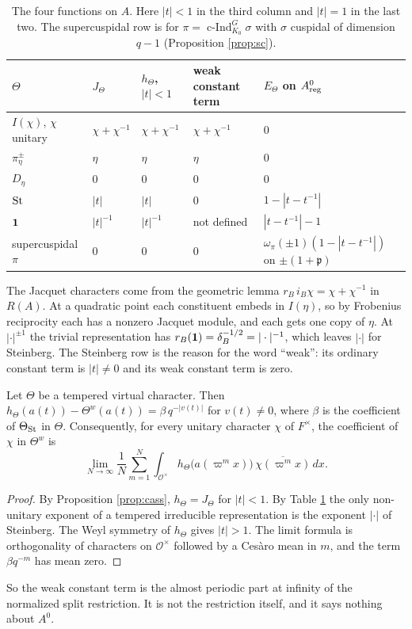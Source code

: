 \begin{table}[htbp]\centering\small
\caption{The four functions on $A$. Here $|t|<1$ in the third column and $|t|=1$ in the last two. The supercuspidal row is for $\pi=\operatorname{c-Ind}_{K_0}^G\sigma$ with $\sigma$ cuspidal of dimension $q-1$ (Proposition \ref{prop:sc}).}\label{tab:four}
\begin{tabular}{@{}lllll@{}}\toprule
$\Theta$ & $J_\Theta$ & $h_\Theta$, $|t|<1$ & weak constant term & $E_\Theta$ on $A^0_{\rm reg}$\\\midrule
$I(\chi)$, $\chi$ unitary & $\chi+\chi^{-1}$ & $\chi+\chi^{-1}$ & $\chi+\chi^{-1}$ & $0$\\
$\pi_\eta^\pm$ & $\eta$ & $\eta$ & $\eta$ & $0$\\
$D_\eta$ & $0$ & $0$ & $0$ & $0$\\
$\operatorname{St}$ & $|t|$ & $|t|$ & $0$ & $1-|t-t^{-1}|$\\
$\mathbf 1$ & $|t|^{-1}$ & $|t|^{-1}$ & not defined & $|t-t^{-1}|-1$\\
supercuspidal $\pi$ & $0$ & $0$ & $0$ & $\omega_\pi(\pm1)(1-|t-t^{-1}|)$ on $\pm(1+\mathfrak p)$\\\bottomrule
\end{tabular}
\end{table}
The Jacquet characters come from the geometric lemma $r_B\,i_B\chi=\chi+\chi^{-1}$ in $R(A)$. At a quadratic point each constituent embeds in $I(\eta)$, so by Frobenius reciprocity each has a nonzero Jacquet module, and each gets one copy of $\eta$. At $|\cdot|^{\pm1}$ the trivial representation has $r_B(\mathbf 1)=\delta_B^{-1/2}=|\cdot|^{-1}$, which leaves $|\cdot|$ for Steinberg. The Steinberg row is the reason for the word ``weak'': its ordinary constant term is $|t|\neq0$ and its weak constant term is zero.

\begin{proposition}\label{prop:bohr}Let $\Theta$ be a tempered virtual character. Then $h_\Theta(a(t))-\Theta^w(a(t))=\beta\,q^{-|v(t)|}$ for $v(t)\ne0$, where $\beta$ is the coefficient of $\Theta_{\operatorname{St}}$ in $\Theta$. Consequently, for every unitary character $\chi$ of $F^\times$, the coefficient of $\chi$ in $\Theta^w$ is
\[
\lim_{N\to\infty}\frac1N\sum_{m=1}^N\int_{\mathcal O^\times}h_\Theta\bigl(a(\varpi^mx)\bigr)\,\overline{\chi(\varpi^mx)}\,dx .
\]
\end{proposition}
\begin{proof}
By Proposition \ref{prop:cass}, $h_\Theta=J_\Theta$ for $|t|<1$. By Table \ref{tab:four} the only non-unitary exponent of a tempered irreducible representation is the exponent $|\cdot|$ of Steinberg. The Weyl symmetry of $h_\Theta$ gives $|t|>1$. The limit formula is orthogonality of characters on $\mathcal O^\times$ followed by a Ces\`aro mean in $m$, and the term $\beta q^{-m}$ has mean zero.
\end{proof}
So the weak constant term is the almost periodic part at infinity of the normalized split restriction. It is not the restriction itself, and it says nothing about $A^0$.

